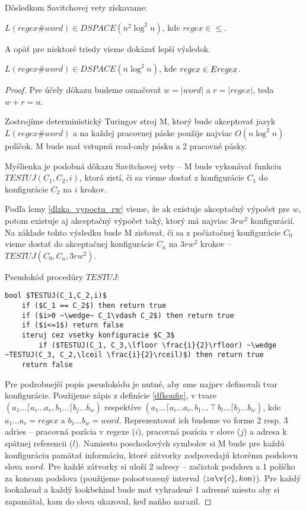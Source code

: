 Dôsledkom Savitchovej vety získavame:
\begin{veta}
$L(regex\#word) \in DSPACE(n^2 \log^2 n)$, kde $regex \in \le$. 
\end{veta}

A opäť pre niektoré triedy vieme dokázať lepší výsledok.

\begin{veta}\label{dspace_nlog2n}
$L(regex\#word) \in DSPACE(n \log^2 n)$, kde $regex \in Eregex$.
\end{veta}
\begin{proof}
Pre účely dôkazu budeme označovať $w = |word|$ a $r = |regex|$, teda $w+r=n$.

Zostrojíme deterministický Turingov stroj M, ktorý bude akceptovať jazyk $L(regex\#word)$ a na každej pracovnej páske použije najviac $O(n\log^2 n)$ políčok. M bude mať vstupnú read-only pásku a 2 pracovné pásky.

Myšlienka je podobná dôkazu Savitchovej vety \cite{Savitch_skripta} -- M bude vykonávať funkciu $TESTUJ(C_1,C_2,i)$, ktorá zistí, či sa vieme dostať z konfigurácie $C_1$ do konfigurácie $C_2$ na $i$ krokov. 

Podľa lemy \ref{dlzka_vypoctu_rw} vieme, že ak existuje akceptačný výpočet pre $w$, potom existuje aj akceptačný výpočet taký, ktorý má najviac $3rw^2$ konfigurácií. Na základe tohto výsledku bude M zisťovať, či sa z počiatočnej konfigurácie $C_0$ vieme dostať do akceptačnej konfigurácie $C_a$ na $3rw^2$ krokov -- $TESTUJ(C_0,C_a,3rw^2)$.

Pseudokód procedúry $TESTUJ$:
\begin{lstlisting}[mathescape]
bool $TESTUJ(C_1,C_2,i)$
	if ($C_1 == C_2$) then return true
	if ($i>0 ~\wedge~ C_1\vdash C_2$) then return true
	if ($i<=1$) return false
	iteruj cez vsetky konfiguracie $C_3$
		if ($TESTUJ(C_1, C_3,\lfloor \frac{i}{2}\rfloor) ~\wedge ~TESTUJ(C_3, C_2,\lceil \frac{i}{2}\rceil)$) then return true
	return false
\end{lstlisting}

Pre podrobnejší popis pseudokódu je nutné, aby sme najprv definovali tvar konfigurácie. Použijeme zápis z definície \ref{dfkonfig}, v tvare $(a_1\dots \lceil a_i \dots a_r, b_1 \dots\lceil b_j \dots b_w)$ respektíve $(a_1\dots \lceil a_i \dots a_r, b_1 \ldots \intercal b_l \dots \lceil b_j \dots b_w)$, kde $a_1\dots a_r = regex$ a $b_1\dots b_w = word$. Reprezentovať ich budeme vo forme 2 resp. 3 adries -- pracovná pozícia v regexe ($i$), pracovná pozícia v slove ($j$) a adresa k spätnej referencii ($l$). Namiesto poschodových symbolov si M bude pre každú konfiguráciu pamätať informáciu, ktoré zátvorky zodpovedajú ktorému podslovu slova $word$. Pre každé zátvorky si uloží 2 adresy -- začiatok podslova a 1 políčko za koncom podslova (použijeme polootvorený interval $\langle za\v{c},kon)$). Pre každý lookahead a každý lookbehind bude mať vyhradené 1 adresné miesto aby si zapamätal, kam do slova ukazoval, keď naňho narazil.


\end{proof}
